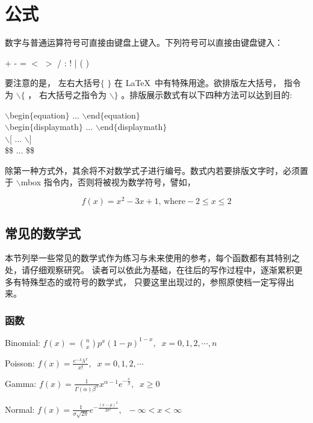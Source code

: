 
\chapter{公式\cite{MathWQC}}
\song\wuhao
数字与普通运算符号可直接由键盘上键入。下列符号可以直接由键盘键入：

        \begin{center}
                    + \;-\; =\; $<$\; $>$ \;/ \;:\; !\; | \;[\; ] \;(\; )\\
        \end{center}
		
要注意的是， 左右大括号$\{$ $\}$ 在 \LaTeX\ 中有特殊用途。欲排版左大括号， 指令为 $\backslash \{$ ，
右大括号之指令为 $\backslash \}$ 。排版展示数式有以下四种方法可以达到目的:
        \begin{center}
$\backslash$begin$\{$equation$\}$ ... $\backslash$end$\{$equation$\}$\\
$\backslash$begin$\{$displaymath$\}$ ... $\backslash$end$\{$displaymath$\}$\\
$\backslash$[ ... $\backslash$]\\
\$\$ ... \$\$
        \end{center}
除第一种方式外，其余将不对数学式子进行编号。数式内若要排版文字时，必须置于
$\backslash$mbox 指令内，否则将被视为数学符号，譬如，

$$f(x)=x^2-3x+1 \mbox{, where} -2 \leq x \leq 2$$
\section{常见的数学式}
本节列举一些常见的数学式作为练习与未来使用的参考，每个函数都有其特别之处，请仔细观察研究。
读者可以依此为基础，在往后的写作过程中，逐渐累积更多有特殊型态的或符号的数学式，
只要这里出现过的，参照原使档一定写得出来。

\subsection{函数}
  Binomial: $f(x)={n\choose x}p^x(1-p)^{1-x}, \;\; x=0,1,2,\cdots,n$ 
  
  Poisson: $f(x)=\frac{e^{-\lambda}\lambda^x}{x!}, \;\;  x=0,1,2,\cdots$ 
  
  Gamma: $f(x)=\frac{1}{\Gamma(\alpha)\beta^\alpha}x^{\alpha-1}e^{-\frac{x}{\beta}}, \;\; x\geq 0$ 
  
  Normal: $f(x)=\frac{1}{\sigma\sqrt{2\pi}}e^{-\frac{(x-\mu)^2}{2\sigma^2}}, \;\;  -\infty < x < \infty $
  
